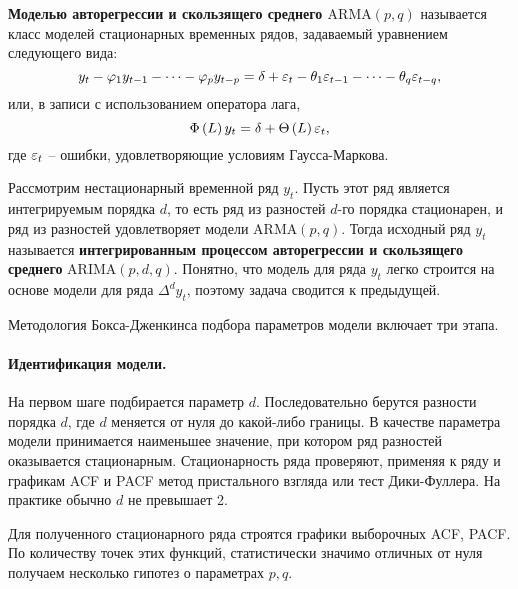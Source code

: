 
\begin{definition}
    \textbf{Моделью авторегрессии и скользящего среднего $\mathrm{ARMA}\left( p, q \right)$} называется класс моделей стационарных временных рядов, задаваемый уравнением следующего вида:
    \begin{equation*}
        y_t - \varphi_1 y_{t-1} - \dots - \varphi_p y_{t-p} = \delta + \varepsilon_t - \theta_1 \varepsilon_{t-1} - \dots - \theta_q \varepsilon_{t-q},
    \end{equation*}
    или, в записи с использованием оператора лага,
    \begin{equation*}
        \Phi\left( L \right) y_t = \delta + \Theta \left( L \right) \varepsilon_t,
    \end{equation*}
    где $\varepsilon_t$ -- ошибки, удовлетворяющие условиям Гаусса-Маркова.
\end{definition}

Рассмотрим нестационарный временной ряд $y_t$.
Пусть этот ряд является интегрируемым порядка $d$, то есть ряд из разностей $d$-го порядка стационарен, и ряд из разностей удовлетворяет модели $\mathrm{ARMA}\left( p, q \right)$.
Тогда исходный ряд $y_t$ называется \textbf{интегрированным процессом авторегрессии и скользящего среднего} $\mathrm{ARIMA}\left( p, d, q \right)$.
Понятно, что модель для ряда $y_t$ легко строится на основе модели для ряда $\Delta^d y_t$, поэтому задача сводится к предыдущей.

Методология Бокса-Дженкинса подбора параметров модели включает три этапа.

\paragraph{Идентификация модели.}

На первом шаге подбирается параметр $d$.
Последовательно берутся разности порядка $d$, где $d$ меняется от нуля до какой-либо границы.
В качестве параметра модели принимается наименьшее значение, при котором ряд разностей оказывается стационарным.
Стационарность ряда проверяют, применяя к ряду и графикам ACF и PACF метод пристального взгляда или тест Дики-Фуллера.
На практике обычно $d$ не превышает 2.

Для полученного стационарного ряда строятся графики выборочных ACF, PACF.
По количеству точек этих функций, статистически значимо отличных от нуля получаем несколько гипотез о параметрах $p, q$.

